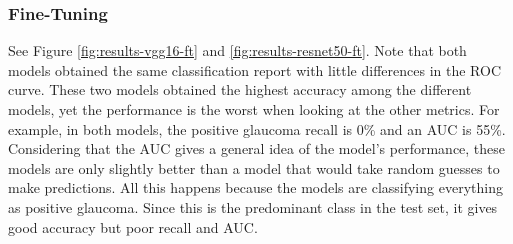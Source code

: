 \documentclass[11pt, a4paper]{article}
\begin{document}
\subsubsection{Fine-Tuning}
See Figure \ref{fig:results-vgg16-ft} and \ref{fig:results-resnet50-ft}. Note that both models obtained the same classification report with little differences in the ROC curve. These two models obtained the highest accuracy among the different models, yet the performance is the worst when looking at the other metrics. For example, in both models, the positive glaucoma recall is 0\% and an AUC is 55\%. Considering that the AUC gives a general idea of the model's performance, these models are only slightly better than a model that would take random guesses to make predictions. All this happens because the models are classifying everything as positive glaucoma. Since this is the predominant class in the test set, it gives good accuracy but poor recall and AUC.
\end{document}
